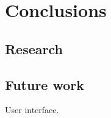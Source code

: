 \documentclass[a4paper,10pt]{article}
\begin{document}
\subsection{}


\newpage
\section{Conclusions}
\subsection{Research}


\subsection{}


\subsection{Future work}
User interface.


\newpage

\end{document}
